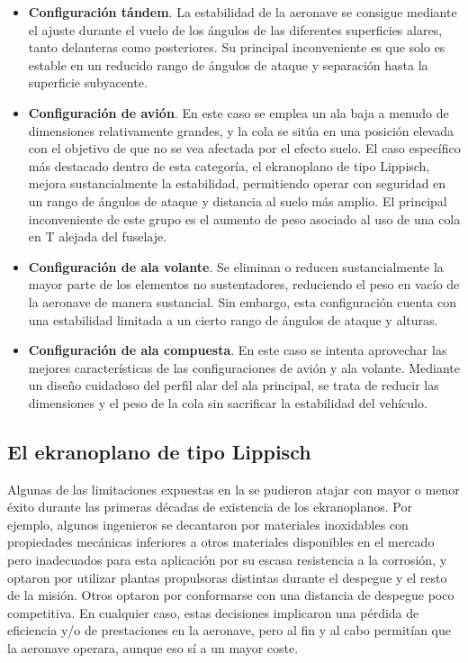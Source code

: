 \begin{itemize}
\item \textbf{Configuración tándem}. La estabilidad de la aeronave se consigue mediante el ajuste durante el vuelo de los ángulos de las diferentes superficies alares, tanto delanteras como posteriores. Su principal inconveniente es que solo es estable en un reducido rango de ángulos de ataque y separación hasta la superficie subyacente.
\item \textbf{Configuración de avión}. En este caso se emplea un ala baja a menudo de dimensiones relativamente grandes, y la cola se sitúa en una posición elevada con el objetivo de que no se vea afectada por el efecto suelo. El caso específico más destacado dentro de esta categoría, el ekranoplano de tipo Lippisch, mejora sustancialmente la estabilidad, permitiendo operar con seguridad en un rango de ángulos de ataque y distancia al suelo más amplio. El principal inconveniente de este grupo es el aumento de peso asociado al uso de una cola en T alejada del fuselaje.
\item \textbf{Configuración de ala volante}. Se eliminan o reducen sustancialmente la mayor parte de los elementos no sustentadores, reduciendo el peso en vacío de la aeronave de manera sustancial. Sin embargo, esta configuración cuenta con una estabilidad limitada a un cierto rango de ángulos de ataque y alturas.
\item \textbf{Configuración de ala compuesta}. En este caso se intenta aprovechar las mejores características de las configuraciones de avión y ala volante. Mediante un diseño cuidadoso del perfil alar del ala principal, se trata de reducir las dimensiones y el peso de la cola sin sacrificar la estabilidad del vehículo.
\end{itemize}


\subsection{El ekranoplano de tipo Lippisch}
\label{sec:wig:lippisch}

Algunas de las limitaciones expuestas en la  se pudieron atajar con mayor o menor éxito durante las primeras décadas de existencia de los ekranoplanos. Por ejemplo, algunos ingenieros se decantaron por materiales inoxidables con propiedades mecánicas inferiores a otros materiales disponibles en el mercado pero inadecuados para esta aplicación por su escasa resistencia a la corrosión, y optaron por utilizar plantas propulsoras distintas durante el despegue y el resto de la misión. Otros optaron por conformarse con una distancia de despegue poco competitiva. En cualquier caso, estas decisiones implicaron una pérdida de eficiencia y/o de prestaciones en la aeronave, pero al fin y al cabo permitían que la aeronave operara, aunque eso sí a un mayor coste.

